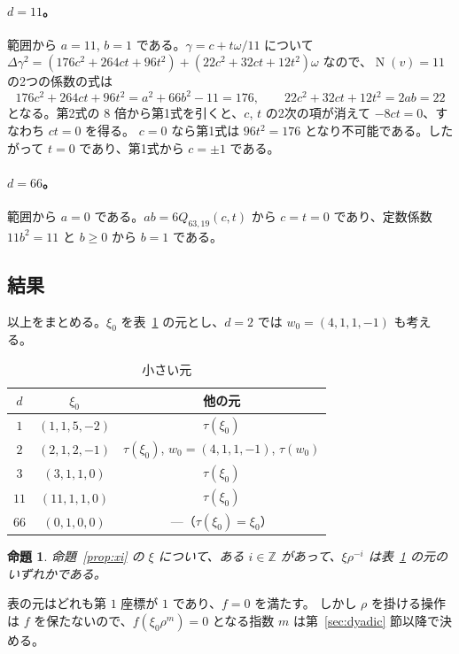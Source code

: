 \documentclass[a4paper,11pt]{ltjsarticle}
\theoremstyle{jplain}
\newtheorem{proposition}[theorem]{命題}
\numberwithin{equation}{section}
\numberwithin{table}{section}
\newcommand{\Z}{\mathbb{Z}}
\newcommand{\Nm}{\operatorname{N}}
\begin{document}
\paragraph{$d=11$。}
範囲から $a=11$, $b=1$ である。$\gamma=c+t\omega/11$ について $\Delta\gamma^2=(176c^2+264ct+96t^2)+(22c^2+32ct+12t^2)\omega$ なので、$\Nm(v)=11$ の2つの係数の式は
\[
176c^2+264ct+96t^2=a^2+66b^2-11=176,\qquad22c^2+32ct+12t^2=2ab=22
\]
となる。第2式の $8$ 倍から第1式を引くと、$c$, $t$ の2次の項が消えて $-8ct=0$、すなわち $ct=0$ を得る。
$c=0$ なら第1式は $96t^2=176$ となり不可能である。したがって $t=0$ であり、第1式から $c=\pm1$ である。

\paragraph{$d=66$。}
範囲から $a=0$ である。$ab=6Q_{63,19}(c,t)$ から $c=t=0$ であり、定数係数 $11b^2=11$ と $b\ge0$ から $b=1$ である。

\subsection{結果}

以上をまとめる。$\xi_0$ を表~\ref{tab:reps} の元とし、$d=2$ では $w_0=(4,1,1,-1)$ も考える。

\begin{table}[htbp]
\centering
\caption{小さい元}\label{tab:reps}
\begin{tabular}{ccc}
\toprule
$d$ & $\xi_0$ & 他の元\\
\midrule
$1$ & $(1,1,5,-2)$ & $\tau(\xi_0)$\\
$2$ & $(2,1,2,-1)$ & $\tau(\xi_0)$, $w_0=(4,1,1,-1)$, $\tau(w_0)$\\
$3$ & $(3,1,1,0)$ & $\tau(\xi_0)$\\
$11$ & $(11,1,1,0)$ & $\tau(\xi_0)$\\
$66$ & $(0,1,0,0)$ & —（$\tau(\xi_0)=\xi_0$）\\
\bottomrule
\end{tabular}
\end{table}

\begin{proposition}\label{prop:small}
命題~\ref{prop:xi} の $\xi$ について、ある $i\in\Z$ があって、$\xi\rho^{-i}$ は表~\ref{tab:reps} の元のいずれかである。
\end{proposition}

表の元はどれも第 $1$ 座標が $1$ であり、$f=0$ を満たす。
しかし $\rho$ を掛ける操作は $f$ を保たないので、$f(\xi_0\rho^m)=0$ となる指数 $m$ は第~\ref{sec:dyadic} 節以降で決める。
\end{document}
